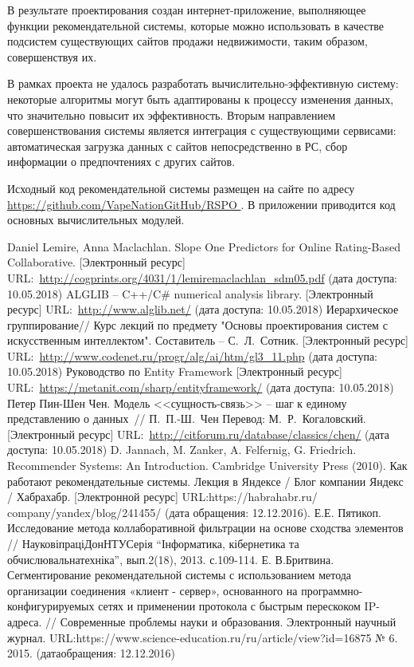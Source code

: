 \documentclass[a4paper,14pt,openany,final]{extreport} %
\begin{document}
{В результате проектирования создан интернет-приложение, выполняющее функции рекомендательной системы, которые можно использовать в качестве подсистем существующих сайтов продажи недвижимости, таким образом, совершенствуя их.

В рамках проекта не удалось разработать вычислительно-эффективную систему: некоторые алгоритмы могут быть адаптированы к процессу изменения данных, что значительно повысит их эффективность. Вторым направлением совершенствования системы является интеграция с существующими сервисами: автоматическая загрузка данных с сайтов непосредственно в РС, сбор информации о предпочтениях с других сайтов.

Исходный код рекомендательной системы размещен на сайте по адресу \url{https://github.com/VapeNationGitHub/RSPO }. В приложении приводится код основных вычислительных модулей.
\begin{thebibliography}{99}
 Daniel Lemire, Anna Maclachlan. Slope One Predictors for Online Rating-Based Collaborative. [Электронный ресурс] URL:~\url{http://cogprints.org/4031/1/lemiremaclachlan_sdm05.pdf} (дата доступа: 10.05.2018)
 ALGLIB -- C++/C\# numerical analysis library. [Электронный ресурс] URL:~\url{http://www.alglib.net/} (дата доступа: 10.05.2018)
 Иерархическое группирование\;// Курс лекций по предмету "Основы проектирования систем с искусственным интеллектом". Составитель -- С.~Л.~Сотник. [Электронный ресурс] URL:~\url{http://www.codenet.ru/progr/alg/ai/htm/gl3_11.php} (дата доступа: 10.05.2018)
 Руководство по Entity Framework [Электронный ресурс] URL:~\url{https://metanit.com/sharp/entityframework/} (дата доступа: 10.05.2018)
 Петер Пин-Шен Чен. Модель <<сущность-связь>> -- шаг к единому представлению о данных~// П.~П.-Ш.~Чен
  Перевод: М.~Р.~Когаловский. [Электронный ресурс] URL:~\url{http://citforum.ru/database/classics/chen/} (дата доступа: 10.05.2018)
 D. Jannach, M. Zanker, A. Felfernig, G. Friedrich. Recommender Systems: An Introduction. Cambridge University Press (2010).
 Как работают рекомендательные системы. Лекция в Яндексе / Блог компании Яндекс / Хабрахабр. [Электронной ресурс] URL:https://habrahabr.ru/
company/yandex/blog/241455/ (дата обращения: 12.12.2016).
 Е.Е. Пятикоп. Исследование метода коллаборативной фильтрации на основе сходства элементов // НауковіпраціДонНТУСерія “Інформатика, кібернетика та обчислювальнатехніка”, вып.2(18), 2013. с.109-114.
 Е. В.Бритвина. Сегментирование рекомендательной системы с использованием метода организации соединения «клиент - сервер», основанного на программно-конфигурируемых сетях и применении протокола с быстрым перескоком IP-адреса. // Современные проблемы науки и образования. Электронный научный журнал. URL:https://www.science-education.ru/ru/article/view?id=16875 № 6. 2015. (датаобращения: 12.12.2016)

\end{thebibliography}}
\end{document}
